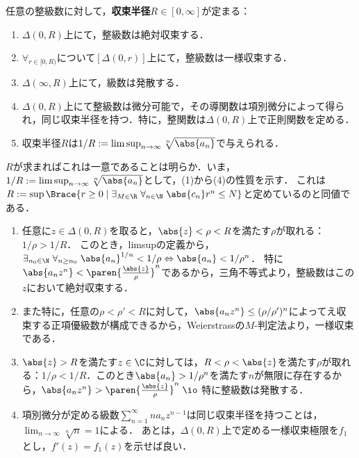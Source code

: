 \documentclass[uplatex, dvipdfmx]{jsreport}
\begin{document}
\begin{theorem}[Abel]
    任意の整級数に対して，\textbf{収束半径}$R\in[0,\infty]$が定まる：
    \begin{enumerate}
        \item $\Delta(0,R)$上にて，整級数は絶対収束する．
        \item $\forall_{r\in[0,R)}$について$[\Delta(0,r)]$上にて，整級数は一様収束する．
        \item $\Delta(\infty,R)$上にて，級数は発散する．
        \item $\Delta(0,R)$上にて整級数は微分可能で，その導関数は項別微分によって得られ，同じ収束半径を持つ．特に，整関数は$\Delta(0,R)$上で正則関数を定める．
        \item 収束半径$R$は$1/R:=\limsup_{n\to\infty}\sqrt[n]{\abs{a_n}}$で与えられる．
    \end{enumerate}
\end{theorem}
\begin{Proof}
    $R$が求まればこれは一意であることは明らか．いま，$1/R:=\limsup_{n\to\infty}\sqrt[n]{\abs{a_n}}$として，(1)から(4)の性質を示す．
    これは$R:=\sup\Brace{r\ge0\mid\exists_{M\in\R}\;\forall_{n\in\N}\;\abs{c_n}r^n\le N}$と定めているのと同値である．
    \begin{enumerate}
        \item 任意に$z\in\Delta(0,R)$を取ると，$\abs{z}<\rho<R$を満たす$\rho$が取れる：$1/\rho>1/R$．
        このとき，limsupの定義から，$\exists_{n_0\in\N}\;\forall_{n\ge n_0}\;\abs{a_n}^{1/n}<1/\rho\Leftrightarrow\abs{a_n}<1/\rho^n$．
        特に$\abs{a_nz^n}<\paren{\frac{\abs{z}}{\rho}}^n$であるから，三角不等式より，整級数はこの$z$において絶対収束する．
        \item また特に，任意の$\rho<\rho'<R$に対して，$\abs{a_nz^n}\le(\rho/\rho')^n$によってえ収束する正項優級数が構成できるから，Weierstrassの$M$-判定法より，一様収束である．
        \item $\abs{z}>R$を満たす$z\in\C$に対しては，$R<\rho<\abs{z}$を満たす$\rho$が取れる：$1/\rho<1/R$．このとき$\abs{a_n}>1/\rho^n$を満たす$n$が無限に存在するから，$\abs{a_nz^n}>\paren{\frac{\abs{z}}{\rho}}^n\;\io$
        特に整級数は発散する．
        \item 項別微分が定める級数$\sum^{\infty}_{n=1}na_nz^{n-1}$は同じ収束半径を持つことは，$\lim_{n\to\infty}\sqrt[n]{n}=1$による．
        あとは，$\Delta(0,R)$上で定める一様収束極限を$f_1$とし，$f'(z)=f_1(z)$を示せば良い．
    \end{enumerate}
\end{Proof}
\end{document}

